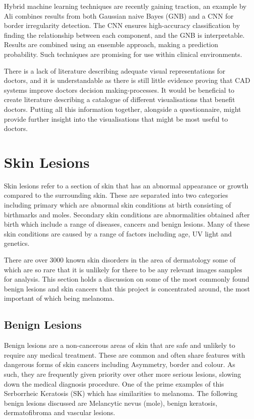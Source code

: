Hybrid machine learning techniques are recently gaining traction, an example by Ali combines results from both Gaussian naive Bayes (GNB) and a CNN\cite{Ali2020b} for border irregularity detection. The CNN ensures high-accuracy classification by finding the relationship between each component, and the GNB is interpretable. Results are combined using an ensemble approach, making a prediction probability. Such techniques are promising for use within clinical environments.

There is a lack of literature describing adequate visual representations for doctors, and it is understandable as there is still little evidence proving that CAD systems improve doctors decision making-processes\cite{FerrantediRuffano2018}. It would be beneficial to create literature describing a catalogue of different visualisations that benefit doctors. Putting all this information together, alongside a questionnaire, might provide further insight into the visualisations that might be most useful to doctors.



\section{Skin Lesions}
Skin lesions refer to a section of skin that has an abnormal appearance or growth compared to the surrounding skin. These are separated into two categories including primary which are abnormal skin conditions at birth consisting of birthmarks and moles. Secondary skin conditions are abnormalities obtained after birth which include a range of diseases, cancers and benign lesions. Many of these skin conditions are caused by a range of factors including age, UV light and genetics.

There are over 3000 known skin disorders in the area of dermatology some of which are so rare that it is unlikely for there to be any relevant images samples for analysis. This section holds a discussion on some of the most commonly found benign lesions and skin cancers that this project is concentrated around, the most important of which being melanoma.

\subsection{Benign Lesions}
Benign lesions are a non-cancerous areas of skin that are safe and unlikely to require any medical treatment. These are common and often share features with dangerous forms of skin cancers including Asymmetry, border and colour. As such, they are frequently given priority over other more serious lesions, slowing down the medical diagnosis procedure. One of the prime examples of this Serborrheic Keratosis (SK) which has similarities to melanoma. The following benign lesions discussed are Melancytic nevus (mole), benign keratosis, dermatofibroma and vascular lesions.

